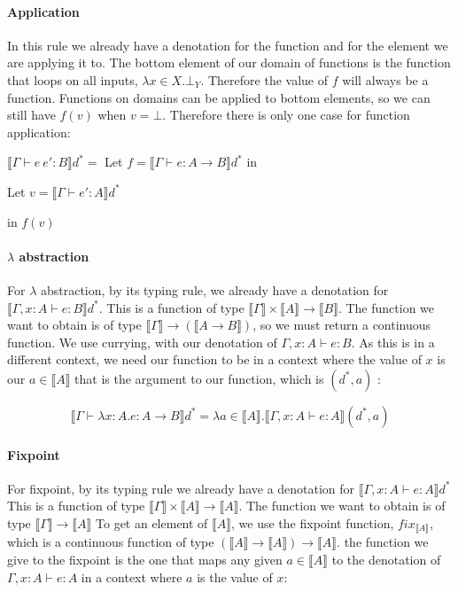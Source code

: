 \paragraph{Application} In this rule we already have a denotation for the function and for the element we are applying it to. The bottom element of our domain of functions is the function that loops on all inputs, $\lambda x \in X. \bot_Y$. Therefore the value of $f$ will always be a function. Functions on domains can be applied to bottom elements, so we can still have $f(v)$ when $v = \bot$. Therefore there is only one case for function application: 

\vspace{0.25cm}

$\llbracket \Gamma \vdash e \ e' : B \rrbracket d^* =$ Let $f = \llbracket \Gamma \vdash e : A \to B \rrbracket d^*$ in 

\hspace{4.5cm} Let $v = \llbracket \Gamma \vdash e' : A \rrbracket d^*$ 

\hspace{7cm} in $f(v)$

\paragraph{$\lambda$ abstraction} For $\lambda$ abstraction, by its typing rule, we already have a denotation for $\llbracket \Gamma , x : A \vdash e : B \rrbracket d^*$. This is a function of type $\llbracket \Gamma \rrbracket \times \llbracket A \rrbracket \to \llbracket B \rrbracket$. The function we want to obtain is of type $\llbracket \Gamma \rrbracket \to  (\llbracket A \to  B \rrbracket)$, so we must return a continuous function. We use currying, with our denotation of $\Gamma, x : A \vdash e : B$. As this is in a different context, we need our function to be in a context where the value of $x$ is our $a \in \llbracket A \rrbracket$ that is the argument to our function, which is $(d^*, a)$ :

\[\llbracket \Gamma \vdash \lambda x : A. e : A \to B \rrbracket d^* = \lambda a \in \llbracket A \rrbracket . \llbracket \Gamma, x : A \vdash e : A \rrbracket(d^*, a)\]
 
\paragraph{Fixpoint} For fixpoint, by its typing rule we already have a denotation for $\llbracket \Gamma , x : A \vdash e : A \rrbracket d^*$ This is a function of type $\llbracket \Gamma \rrbracket \times \llbracket A \rrbracket \to \llbracket A \rrbracket$. The function we want to obtain is of type $\llbracket \Gamma \rrbracket \to  \llbracket A \rrbracket$ To get an element of $\llbracket A \rrbracket$, we use the fixpoint function, $fix_{\llbracket A \rrbracket}$, which is a continuous function of type $(\llbracket A \rrbracket \to \llbracket A \rrbracket) \to \llbracket A \rrbracket$. the function we give to the fixpoint is the one that maps any given $a \in \llbracket A \rrbracket$ to the denotation of $ \Gamma , x : A \vdash e : A$ in a context where $a$ is the value of $x$:

